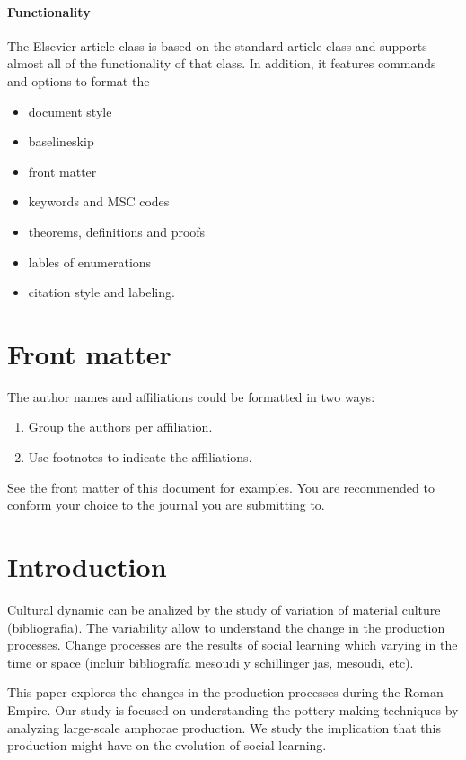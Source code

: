 \documentclass[review]{elsarticle}
\begin{document}
\paragraph{Functionality} The Elsevier article class is based on the standard article class and supports almost all of the functionality of that class. In addition, it features commands and options to format the
\begin{itemize}
\item document style
\item baselineskip
\item front matter
\item keywords and MSC codes
\item theorems, definitions and proofs
\item lables of enumerations
\item citation style and labeling.
\end{itemize}

\section{Front matter}

The author names and affiliations could be formatted in two ways:
\begin{enumerate}[(1)]
\item Group the authors per affiliation.
\item Use footnotes to indicate the affiliations.
\end{enumerate}
See the front matter of this document for examples. You are recommended to conform your choice to the journal you are submitting to.
\section{Introduction}

Cultural dynamic can be analized by the study of variation of material culture (bibliografia). The variability allow to understand the change in the production processes. Change processes are the results of social learning which varying in the time or space (incluir bibliografía mesoudi y schillinger jas, mesoudi, etc). 


This paper explores the changes in the production processes during the Roman Empire. Our study is focused on understanding the pottery-making techniques by analyzing large-scale amphorae production. We study the implication that this production might have on the evolution of social learning. 
\end{document}

